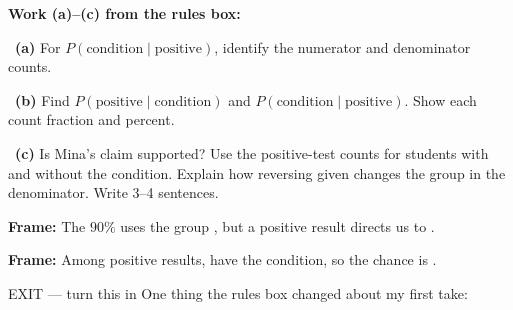 \documentclass[11pt]{article}
\begin{document}
\newpage
\textbf{Work (a)--(c) from the rules box:}\par\smallskip

~\textbf{(a)} For $P(\text{condition}\mid\text{positive})$, identify the numerator and denominator counts.\par
\workspace{0.7in}

~\textbf{(b)} Find $P(\text{positive}\mid\text{condition})$ and $P(\text{condition}\mid\text{positive})$. Show each count fraction and percent.\par
\workspace{1.3in}

~\textbf{(c)} Is Mina's claim supported? Use the positive-test counts for students with and without the condition. Explain how reversing given changes the group in the denominator. Write 3--4 sentences.\par
\workspace{2.0in}

\begin{sentenceframebox}\raggedright\textbf{Frame:} The $90\%$ uses the group \blank[1.6in], but a positive result directs us to \blank[1.8in].\end{sentenceframebox}

\begin{sentenceframebox}\raggedright\textbf{Frame:} Among \blank[0.6in] positive results, \blank[0.6in] have the condition, so the chance is \blank[0.8in].\end{sentenceframebox}

\begin{summaryexitbox}{EXIT --- turn this in}
One thing the rules box changed about my first take: \hrulefill\par
\workspace{0.4in}
\end{summaryexitbox}
\end{document}

